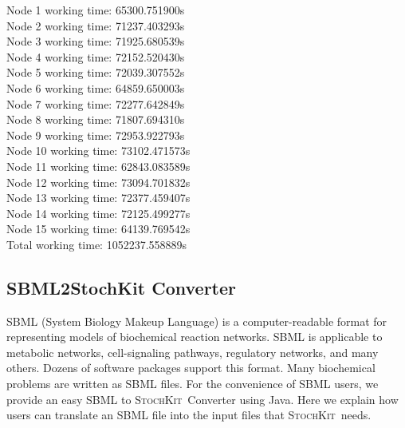 \documentclass[12pt]{article}
\newcommand{\sspack}{\textsc{StochKit}}
\begin{document}
\begin{center}
Node 1 working time: 65300.751900s \\
Node 2 working time: 71237.403293s \\
Node 3 working time: 71925.680539s \\
Node 4 working time: 72152.520430s \\
Node 5 working time: 72039.307552s \\
Node 6 working time: 64859.650003s \\
Node 7 working time: 72277.642849s \\
Node 8 working time: 71807.694310s \\
Node 9 working time: 72953.922793s \\
Node 10 working time: 73102.471573s \\
Node 11 working time: 62843.083589s \\
Node 12 working time: 73094.701832s \\
Node 13 working time: 72377.459407s \\
Node 14 working time: 72125.499277s \\
Node 15 working time: 64139.769542s \\

Total working time: 1052237.558889s   \\
\end{center}

\subsection{SBML2StochKit Converter}

SBML (System Biology Makeup Language) \cite{sbml}
is a computer-readable format for representing models of biochemical reaction networks. SBML
is applicable to
metabolic networks, cell-signaling pathways, regulatory networks, and many others.
Dozens of software packages
support this format. Many biochemical problems are written as SBML files. For the
convenience of SBML users, we provide an easy SBML to \sspack\  Converter using Java.
Here we explain how users can
translate an SBML file into the input files that \sspack\ needs.
\end{document}
